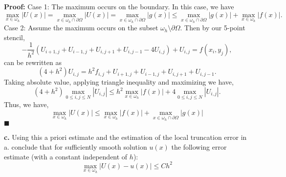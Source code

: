 \documentclass[11pt]{article}
\begin{document}
\textbf{Proof:} Case 1: The maximum occurs on the boundary.
In this case, we have
\begin{equation*}
    \max_{x \in \omega_h} |U(x)| = \max_{x \in \omega_h \cap \partial \Omega} |U(x)| = \max_{x \in \omega_h \cap \partial \Omega} |g(x)| \leq \max_{x \in \omega_h \cap \partial \Omega} |g(x)| + \max_{x \in \omega_h} |f(x)|.
\end{equation*}
Case 2: Assume the maximum occurs on the subset $\omega_h \setminus \partial \Omega$.
Then by our 5-point stencil,
\begin{equation*}
    -\frac{1}{h^2}( U_{i+1,j} + U_{i-1,j} + U_{i,j+1} + U_{i,j-1} - 4 U_{i,j} ) + U_{i,j} = f(x_i, y_j),
\end{equation*}
can be rewritten as
\begin{equation*}
    (4 + h^2) U_{i,j} = h^2 f_{i,j}  + U_{i+1,j} + U_{i-1,j} + U_{i,j+1} + U_{i,j-1}.
\end{equation*}
Taking absolute value, applying triangle inequality and maximizing we have,
\begin{equation*}
    (4 + h^2) \max_{0 \leq i,j \leq N} |U_{i,j}| \leq h^2 \max_{x \in \omega_h} |f(x)| + 4\max_{0 \leq i,j \leq N} |U_{i,j}|.
\end{equation*}
Thus, we have,
\begin{equation*}
    \max_{x \in \omega_h} |U(x)| \leq \max_{x \in \omega_h} |f(x)| + \max_{x \in \omega_h \cap \partial \Omega} |g(x)|
\end{equation*}
$\blacksquare$




\vskip 2cm



\textbf{c.} Using this a priori estimate and the estimation of the local truncation error in a.
conclude that for sufficiently smooth solution $u(x)$ the following error estimate (with a constant independent of $h$):
\begin{equation}
    \max_{x\in\omega_h} |U(x) - u(x)| \leq Ch^2
\end{equation}

\vskip 1cm
\end{document}
